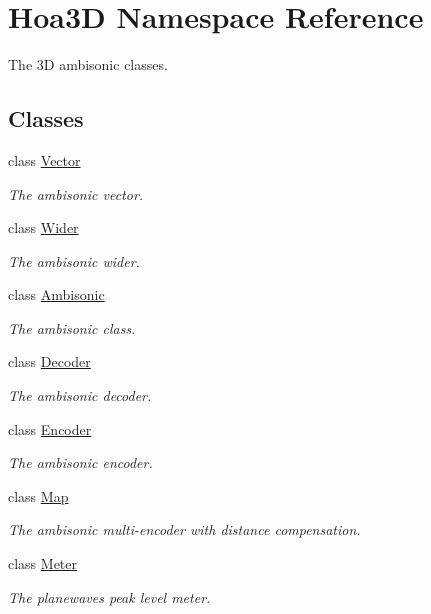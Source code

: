 \hypertarget{namespace_hoa3_d}{\section{Hoa3\-D Namespace Reference}
\label{namespace_hoa3_d}
}


The 3\-D ambisonic classes.  


\subsection*{Classes}
\begin{DoxyCompactItemize}
\item 
class \hyperlink{class_hoa3_d_1_1_vector}{Vector}
\begin{DoxyCompactList}\small\item\em The ambisonic vector. \end{DoxyCompactList}\item 
class \hyperlink{class_hoa3_d_1_1_wider}{Wider}
\begin{DoxyCompactList}\small\item\em The ambisonic wider. \end{DoxyCompactList}\item 
class \hyperlink{class_hoa3_d_1_1_ambisonic}{Ambisonic}
\begin{DoxyCompactList}\small\item\em The ambisonic class. \end{DoxyCompactList}\item 
class \hyperlink{class_hoa3_d_1_1_decoder}{Decoder}
\begin{DoxyCompactList}\small\item\em The ambisonic decoder. \end{DoxyCompactList}\item 
class \hyperlink{class_hoa3_d_1_1_encoder}{Encoder}
\begin{DoxyCompactList}\small\item\em The ambisonic encoder. \end{DoxyCompactList}\item 
class \hyperlink{class_hoa3_d_1_1_map}{Map}
\begin{DoxyCompactList}\small\item\em The ambisonic multi-\/encoder with distance compensation. \end{DoxyCompactList}\item 
class \hyperlink{class_hoa3_d_1_1_meter}{Meter}
\begin{DoxyCompactList}\small\item\em The planewaves peak level meter. \end{DoxyCompactList}\item 

\end{DoxyCompactItemize}
